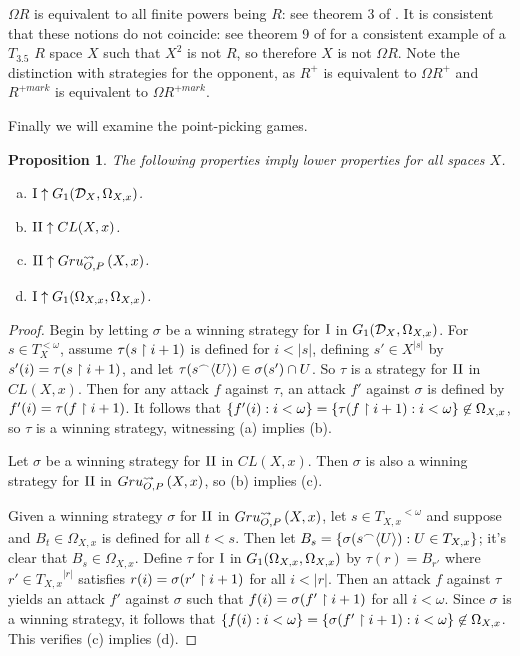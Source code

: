 \documentclass{amsart}
\theoremstyle{plain}
\newtheorem{proposition}[theorem]{Proposition}
\theoremstyle{definition}
\theoremstyle{remark}
\theoremstyle{plain}
\theoremstyle{definition}
\theoremstyle{remark}
\begin{document}
\(\Omega R\) is equivalent to all finite powers being \(R\): see theorem 3 of \cite{Scheepers1997}. 
It is consistent that these notions do not coincide: see theorem 9 of \cite{BABINKOSTOVA2013} for a consistent example of a \(T_{3.5}\) \(R\) space \(X\) such that \(X^2\) is not \(R\), so therefore \(X\) is not \(\Omega R\). 
Note the distinction with strategies for the opponent, as \(R^+\) is equivalent to \(\Omega R^+\) and \(R^{+mark}\) is equivalent to \(\Omega R^{+mark}\).

Finally we will examine the point-picking games.

\begin{proposition}
The following properties imply lower properties for all spaces \(X\).
 \begin{enumerate}[a)]
  \item \(\mathrm{I}\uparrow G_{1}(\mathcal{D}_X,\Omega_{X,x})\).
  \item \(\mathrm{II}\uparrow CL(X,x)\).
  \item \(\mathrm{II}\uparrow Gru_{O,P}^{\leadsto}\left({X},{x}\right)\).
  \item \(\mathrm{I}\uparrow G_{1}(\Omega_{X,x},\Omega_{X,x})\).
 \end{enumerate}
\end{proposition}
\begin{proof}
 Begin by letting \(\sigma\) be a winning strategy for \(\mathrm{I}\) in \(G_{1}(\mathcal{D}_X,\Omega_{X,x})\). 
 For \(s\in T_{X}^{<\omega}\), assume \(\tau(s\restriction i+1)\) is defined for \(i<|s|\), defining \(s'\in X^{|s|}\) by \(s'(i)=\tau(s\restriction i+1)\), and let \(\tau(s{^\frown}\langle U\rangle)\in\sigma(s')\cap U\). 
 So \(\tau\) is a strategy for \(\mathrm{II}\) in \(CL(X,x)\). Then for any attack \(f\) against \(\tau\), an attack \(f'\) against \(\sigma\) is defined by \(f'(i)=\tau(f\restriction i+1)\). 
 It follows that \(\{f'(i):i<\omega\}=\{\tau(f\restriction i+1):i<\omega\}\not\in\Omega_{X,x}\), so \(\tau\) is a winning strategy, witnessing (a) implies (b).

 Let \(\sigma\) be a winning strategy for \(\mathrm{II}\) in \(CL(X,x)\). 
 Then \(\sigma\) is also a winning strategy for \(\mathrm{II}\) in \(Gru_{O,P}^{\leadsto}\left({X},{x}\right)\), so (b) implies (c).

 Given a winning strategy \(\sigma\) for \(\mathrm{II}\) in \(Gru_{O,P}^{\leadsto}\left({X},{x}\right)\), let \(s\in {T_{X,x}}^{<\omega}\) and suppose and \(B_t\in\Omega_{X,x}\) is defined for all \(t<s\). 
 Then let \(B_s=\{\sigma(s{^\frown}\langle U\rangle):U\in T_{X,x}\}\); it's clear that \(B_s\in\Omega_{X,x}\). 
 Define \(\tau\) for \(\mathrm{I}\) in \(G_{1}(\Omega_{X,x},\Omega_{X,x})\) by \(\tau(r)=B_{r'}\) where \(r'\in {T_{X,x}}^{|r|}\) satisfies \(r(i)=\sigma(r'\restriction i+1)\) for all \(i<|r|\). 
 Then an attack \(f\) against \(\tau\) yields an attack \(f'\) against \(\sigma\) such that \(f(i)=\sigma(f'\restriction i+1)\) for all \(i<\omega\). 
 Since \(\sigma\) is a winning strategy, it follows that \(\{f(i):i<\omega\}=\{\sigma(f'\restriction i+1):i<\omega\}\not\in\Omega_{X,x}\). 
 This verifies (c) implies (d).
\end{proof}
\end{document}
